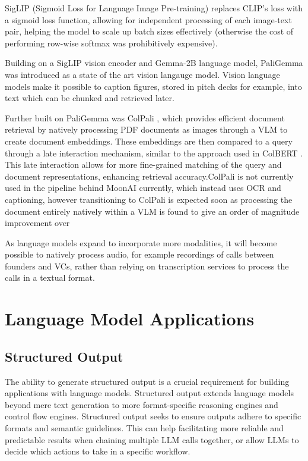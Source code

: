 \documentclass[a4paper, oneside]{discothesis}
\begin{document}
SigLIP (Sigmoid Loss for Language Image Pre-training) \cite{zhai2022siglip} replaces CLIP's loss with a sigmoid loss function, allowing for independent processing of each image-text pair, helping the model to scale up batch sizes effectively (otherwise the cost of performing row-wise softmax was prohibitively expensive). 

Building on a SigLIP vision encoder and Gemma-2B language model, PaliGemma was introduced as a state of the art vision langauge model. \cite{gemma2024pali} 
Vision language models make it possible to caption figures, stored in pitch decks for example, into text which can be chunked and retrieved later.

Further built on PaliGemma was ColPali \cite{faysse_sibille_2024colpali}, which provides efficient document retrieval by natively processing PDF documents as images through a VLM to create document embeddings. These embeddings are then compared to a query through a late interaction mechanism, similar to the approach used in ColBERT \cite{khattab2020colbert}. This late interaction allows for more fine-grained matching of the query and document representations, enhancing retrieval accuracy.ColPali is not currently used in the pipeline behind MoonAI currently, which instead uses OCR and captioning, however transitioning to ColPali is expected soon as processing the document entirely natively within a VLM is found to give an order of magnitude improvement over 

As language models expand to incorporate more modalities, it will become possible to natively process audio, for example recordings of calls between founders and VCs, rather than relying on transcription services to process the calls in a textual format. 

\section{Language Model Applications}

\subsection{Structured Output}
The ability to generate structured output is a crucial requirement for building applications with language models. Structured output extends language models beyond mere text generation to more format-specific reasoning engines and control flow engines. Structured output seeks to ensure outputs adhere to specific formats and semantic guidelines. This can help facilitating more reliable and predictable results when chaining multiple LLM calls together,  or allow LLMs to decide which actions to take in a specific workflow.
\end{document}

